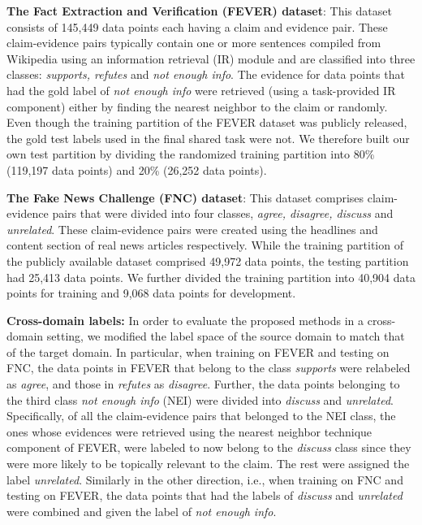 \textbf{The Fact Extraction and Verification (FEVER) dataset}: This dataset consists of 145,449 data points each having a claim and evidence pair. These claim-evidence pairs typically contain one or more sentences compiled from Wikipedia using an information retrieval (IR) module and are classified into three classes: \textit{supports, refutes} and \textit{not enough info}. The evidence for data points that had the gold label of \textit{not enough info} were  retrieved (using a task-provided IR component) either by finding the nearest neighbor to the claim or randomly. Even though the training partition of the FEVER dataset was publicly released, the gold test labels used in the final shared task were not. We therefore built our own test partition by dividing the randomized training partition into 80\% (119,197 data points) and 20\% (26,252 data points).

\textbf{The Fake News Challenge (FNC) dataset}: This dataset comprises claim-evidence pairs that were divided into four classes,
\textit{agree, disagree, discuss} and \textit{unrelated}. These claim-evidence pairs were created using the headlines and content section of real news articles respectively. While the training partition of the publicly available dataset comprised 49,972 data points, the testing partition had 25,413 data points. We further divided the training partition into
40,904 data points for training and 9,068 data points for development.

\textbf{Cross-domain labels:} In order to evaluate the proposed methods in a cross-domain setting, we modified the label space of the source domain to match that of the target domain. In particular, when training on FEVER and testing on FNC, the data points in FEVER that belong
to the class \textit{supports} were relabeled as \textit{agree}, and
those in \textit{refutes} as \textit{disagree}. Further, the data points belonging to the third class \textit{not enough info} (NEI) were divided into
\textit{discuss} and \textit{unrelated}. Specifically, of all the claim-evidence pairs that belonged to the NEI class, the ones whose evidences were retrieved using the nearest neighbor technique component of FEVER, were labeled to now belong to the \textit{discuss} class since they were more likely
to be topically relevant to the claim. The rest were assigned the label \textit{unrelated}. Similarly in the other direction, i.e., when training on FNC and testing on FEVER, the data points that had the labels of \textit{discuss} and \textit{unrelated} were combined and given the label of \textit{not enough info}.




